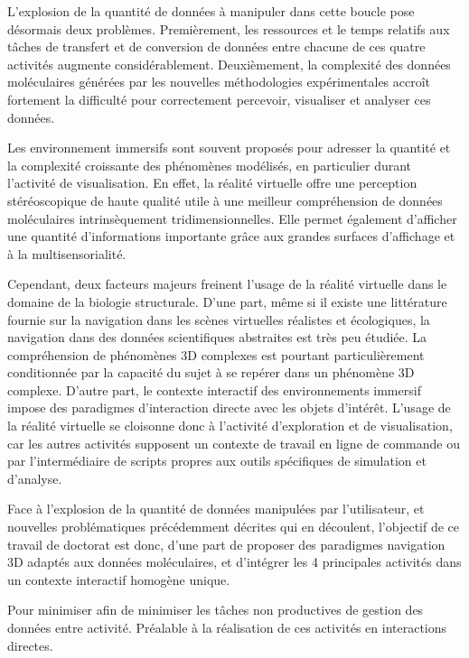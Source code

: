 L'explosion de la quantité de données à manipuler dans cette boucle pose désormais deux problèmes. Premièrement, les ressources et le temps relatifs aux tâches de transfert et de conversion de données entre chacune de ces quatre activités augmente considérablement. Deuxièmement, la complexité des données moléculaires générées par les nouvelles méthodologies expérimentales accroît fortement la difficulté pour correctement percevoir, visualiser et analyser ces données.

Les environnement immersifs sont souvent proposés pour adresser la quantité et la complexité croissante des phénomènes modélisés, en particulier durant l'activité de visualisation. En effet, la réalité virtuelle offre une perception stéréoscopique de haute qualité utile à une meilleur compréhension de données moléculaires intrinsèquement tridimensionnelles. Elle permet également d'afficher une quantité d'informations importante grâce aux grandes surfaces d'affichage et à la multisensorialité. 

Cependant, deux facteurs majeurs freinent l'usage de la réalité virtuelle dans le domaine de la biologie structurale. D'une part, même si il existe une littérature fournie sur la navigation dans les scènes virtuelles réalistes et écologiques, la navigation dans des données scientifiques abstraites est très peu étudiée. La compréhension de phénomènes 3D complexes est pourtant particulièrement conditionnée par la capacité du sujet à se repérer dans un phénomène 3D complexe. D'autre part, le contexte interactif des environnements immersif impose des paradigmes d'interaction directe avec les objets d'intérêt. L'usage de la réalité virtuelle se cloisonne donc à l'activité d'exploration et de visualisation, car les autres activités supposent un contexte de travail en ligne de commande ou par l'intermédiaire de scripts propres aux outils spécifiques de simulation et d'analyse.







Face à l'explosion de la quantité de données manipulées par l'utilisateur, et nouvelles problématiques précédemment décrites qui en découlent, l'objectif de ce travail de doctorat est donc, d'une part de proposer des paradigmes navigation 3D adaptés aux données moléculaires, et d'intégrer les 4 principales activités dans un contexte interactif homogène unique. 

Pour minimiser afin de minimiser les tâches non productives de gestion des données entre activité. 
Préalable à la réalisation de ces activités en interactions directes.

